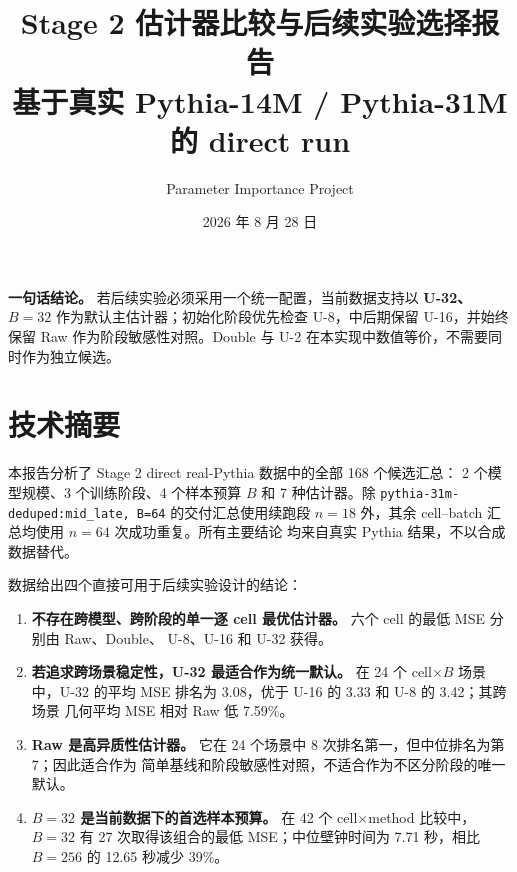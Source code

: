\documentclass[11pt,a4paper]{ctexart}
\title{\bfseries Stage 2 估计器比较与后续实验选择报告\\[6pt]
  \large 基于真实 Pythia-14M / Pythia-31M 的 direct run}
\author{Parameter Importance Project}
\date{2026 年 8 月 28 日}
\newcommand{\method}[1]{\textsf{#1}}
\newcommand{\best}[1]{\textcolor{positive}{\textbf{#1}}}
\newcommand{\sourceid}[1]{\texttt{\small #1}}
\begin{document}
\maketitle

\begin{center}
\colorbox{softblue}{
  \parbox{0.92\textwidth}{
    \textbf{一句话结论。}\quad
    若后续实验必须采用一个统一配置，当前数据支持以
    \best{U-32、$B=32$} 作为默认主估计器；初始化阶段优先检查
    \method{U-8}，中后期保留 \method{U-16}，并始终保留
    \method{Raw} 作为阶段敏感性对照。\method{Double} 与
    \method{U-2} 在本实现中数值等价，不需要同时作为独立候选。
  }
}
\end{center}

\vspace{6pt}
\begingroup
\small
\setcounter{tocdepth}{1}
\tableofcontents
\endgroup
\newpage

\section{技术摘要}

本报告分析了 Stage 2 direct real-Pythia 数据中的全部 168 个候选汇总：
2 个模型规模、3 个训练阶段、4 个样本预算 $B$ 和 7 种估计器。除
\sourceid{pythia-31m-deduped:mid\_late, B=64} 的交付汇总使用续跑段
$n=18$ 外，其余 cell--batch 汇总均使用 $n=64$ 次成功重复。所有主要结论
均来自真实 Pythia 结果，不以合成数据替代。

数据给出四个直接可用于后续实验设计的结论：

\begin{enumerate}
  \item \textbf{不存在跨模型、跨阶段的单一逐 cell 最优估计器。}
    六个 cell 的最低 MSE 分别由 \method{Raw}、\method{Double}、
    \method{U-8}、\method{U-16} 和 \method{U-32} 获得。
  \item \textbf{若追求跨场景稳定性，\method{U-32} 最适合作为统一默认。}
    在 24 个 cell$\times B$ 场景中，\method{U-32} 的平均 MSE 排名为
    3.08，优于 \method{U-16} 的 3.33 和 \method{U-8} 的 3.42；其跨场景
    几何平均 MSE 相对 \method{Raw} 低 7.59\%。
  \item \textbf{\method{Raw} 是高异质性估计器。}
    它在 24 个场景中 8 次排名第一，但中位排名为第 7；因此适合作为
    简单基线和阶段敏感性对照，不适合作为不区分阶段的唯一默认。
  \item \textbf{$B=32$ 是当前数据下的首选样本预算。}
    在 42 个 cell$\times$method 比较中，$B=32$ 有 27 次取得该组合的最低
    MSE；中位壁钟时间为 7.71 秒，相比 $B=256$ 的 12.65 秒减少 39\%。
\end{enumerate}
\end{document}
